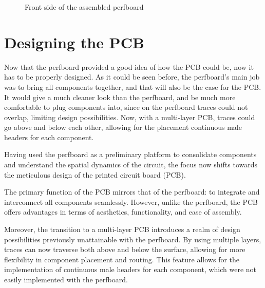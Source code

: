 \begin{figure}[h]
\begin{minipage}[b]{0.45\textwidth}
        \caption{Front side of the assembled perfboard}
        \label{fig:perfboard_assembled_front}
    \end{minipage}
\end{figure}


\section{Designing the PCB}

Now that the perfboard provided a good idea of how the PCB could be, now it has to be properly designed. As it could be seen before, the perfboard's main job was to bring all components together, and that will also be the case for the PCB. It would give a much cleaner look than the perfboard, and be much more comfortable to plug components into, since on the perfboard traces could not overlap, limiting design possibilities. Now, with a multi-layer PCB, traces could go above and below each other, allowing for the placement continuous male headers for each component.

Having used the perfboard as a preliminary platform to consolidate components and understand the spatial dynamics of the circuit, the focus now shifts towards the meticulous design of the printed circuit board (PCB).

The primary function of the PCB mirrors that of the perfboard: to integrate and interconnect all components seamlessly. However, unlike the perfboard, the PCB offers advantages in terms of aesthetics, functionality, and ease of assembly.

Moreover, the transition to a multi-layer PCB introduces a realm of design possibilities previously unattainable with the perfboard. By using multiple layers, traces can now traverse both above and below the surface, allowing for more flexibility in component placement and routing. This feature allows for the implementation of continuous male headers for each component, which were not easily implemented with the perfboard.
